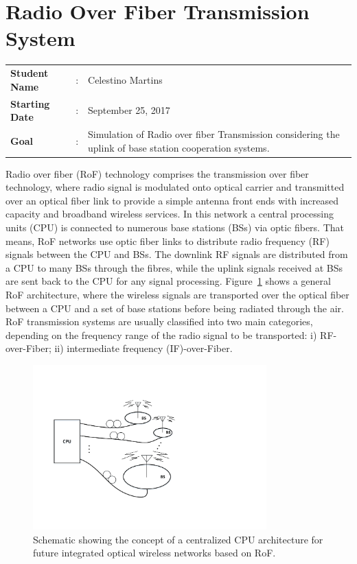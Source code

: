 \clearpage
\section{Radio Over Fiber Transmission System}

\begin{tcolorbox}	
\begin{tabular}{p{2.75cm} p{0.2cm} p{10.5cm}} 	
\textbf{Student Name}  &:& Celestino Martins\\
\textbf{Starting Date} &:& September 25, 2017\\
\textbf{Goal}          &:& Simulation of Radio over fiber Transmission considering the uplink of base station cooperation systems.
\end{tabular}
\end{tcolorbox}

Radio over fiber (RoF) technology comprises the transmission over fiber technology, where radio signal is modulated onto optical carrier and transmitted over an optical fiber link to provide a simple antenna front ends with increased capacity and broadband wireless services.  In this network a central processing units (CPU) is connected to numerous base stations (BSs) via optic fibers. That means, RoF networks use optic fiber links to distribute radio frequency (RF) signals between the CPU and BSs. The downlink RF signals are distributed from a CPU to many BSs through the fibres, while the uplink signals received at BSs are sent back to the CPU for any signal processing. Figure~\ref{fig_RoFarch} shows a general RoF architecture, where the wireless signals are transported over the optical fiber between a CPU and a set of base stations before being radiated through the air. RoF transmission systems are usually classified into two main categories, depending on the frequency range of the radio signal to be transported: i) RF-over-Fiber; ii) intermediate frequency (IF)-over-Fiber.

\begin{figure}[h!]
    \centering
    \includegraphics[width=9cm]{./sdf/radio_over_fiber/figures/RoF_architecture.pdf}
    \caption{Schematic showing the concept of a centralized CPU architecture for future integrated optical wireless networks based on RoF.}
    \label{fig_RoFarch}
\end{figure}


